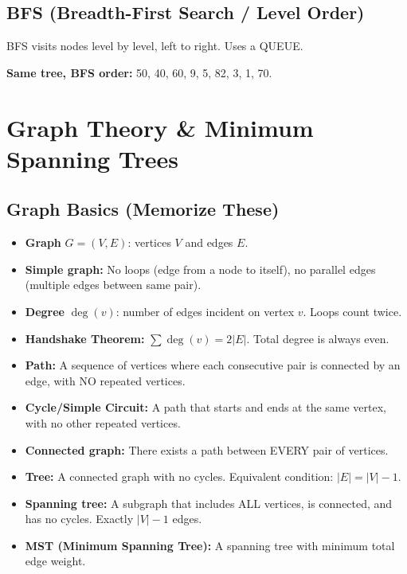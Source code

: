 \documentclass[12pt,portrait]{article}
\begin{document}
\subsection{BFS (Breadth-First Search / Level Order)}

BFS visits nodes level by level, left to right. Uses a QUEUE.

\textbf{Same tree, BFS order:} 50, 40, 60, 9, 5, 82, 3, 1, 70.

\newpage

\section{Graph Theory \& Minimum Spanning Trees}
\label{sec:mst}

\subsection{Graph Basics (Memorize These)}

\begin{rulebox}
\begin{itemize}[leftmargin=*]
    \item \textbf{Graph} $G = (V, E)$: vertices $V$ and edges $E$.
    \item \textbf{Simple graph:} No loops (edge from a node to itself), no parallel edges (multiple edges between same pair).
    \item \textbf{Degree} $\deg(v)$: number of edges incident on vertex $v$. Loops count twice.
    \item \textbf{Handshake Theorem:} $\sum \deg(v) = 2|E|$. Total degree is always even.
    \item \textbf{Path:} A sequence of vertices where each consecutive pair is connected by an edge, with NO repeated vertices.
    \item \textbf{Cycle/Simple Circuit:} A path that starts and ends at the same vertex, with no other repeated vertices.
    \item \textbf{Connected graph:} There exists a path between EVERY pair of vertices.
    \item \textbf{Tree:} A connected graph with no cycles. Equivalent condition: $|E| = |V| - 1$.
    \item \textbf{Spanning tree:} A subgraph that includes ALL vertices, is connected, and has no cycles. Exactly $|V|-1$ edges.
    \item \textbf{MST (Minimum Spanning Tree):} A spanning tree with minimum total edge weight.
\end{itemize}
\end{rulebox}
\end{document}
